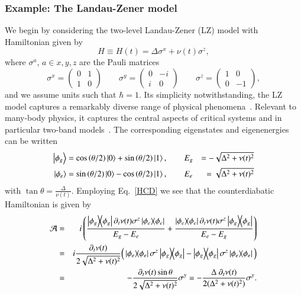 \subsubsection{Example: The Landau-Zener model}
\label{sec:LandauZener}
We begin by considering the two-level Landau-Zener (LZ) model with Hamiltonian given by
\begin{equation}
\label{eq:LZham}
H\equiv H(t)=\Delta \sigma^x + \nu(t) \sigma^z,
\end{equation}
where $\sigma^a$, $a \in {x,y,z} $ are the Pauli matrices
\begin{equation}
\sigma^x = \begin{pmatrix}
0 & 1 \\ 1 & 0
\end{pmatrix} \qquad \sigma^y = \begin{pmatrix}
0 & -i \\ i & 0
\end{pmatrix} \qquad \sigma^z = \begin{pmatrix}
1 & 0 \\ 0 & -1
\end{pmatrix},
\end{equation}
and we assume units such that $\hbar\!=\!1$. Its simplicity notwithstanding, the LZ model captures a remarkably diverse range of physical phenomena~\cite{LZreview}. Relevant to many-body physics, it captures the central aspects of critical systems and in particular two-band models~\cite{Damski2005}. The corresponding eigenstates and eigenenergies can be written
\begin{eqnarray}
\ket{\phi_g} &= \cos \left(\theta/2\right) \ket{0} + \sin \left(\theta/2\right) \ket{1}, \qquad E_g &= -\sqrt{\Delta^2 + \nu(t)^2}  \nonumber \\
\ket{\phi_e} &= \sin \left(\theta/2\right) \ket{0} - \cos \left(\theta/2\right) \ket{1}, \qquad E_e &= \sqrt{\Delta^2 + \nu(t)^2}
\end{eqnarray}
with $\tan \theta = \tfrac{\Delta}{\nu(t)}$. Employing Eq.~\eqref{HCD} we see that the counterdiabatic Hamiltonian is given by
\begin{eqnarray}
\mathcal{A} &=& i \left( \frac{\ketbra{\phi_g}{\phi_g} \partial_t \nu(t) \sigma^z \ketbra{\phi_e}{\phi_e}}{E_g - E_e} + \frac{\ketbra{\phi_e}{\phi_e} \partial_t \nu(t) \sigma^z \ketbra{\phi_g}{\phi_g}}{E_e - E_g}  \right)  \nonumber \\
&=& i \frac{\partial_t \nu(t)}{2\sqrt{\Delta^2+\nu(t)^2}}\Big(\ketbra{\phi_e}{\phi_e}\sigma^z\ketbra{\phi_g}{\phi_g} - \ketbra{\phi_g}{\phi_g}\sigma^z\ketbra{\phi_e}{\phi_e} \Big) \nonumber  \\
&=& - \frac{\partial_t \nu(t) \sin \theta}{2\sqrt{\Delta^2+\nu(t)^2}} \sigma^y = - \frac{\Delta~\partial_t \nu(t)}{2(\Delta^2+\nu(t)^2)} \sigma^y. 
\end{eqnarray}
